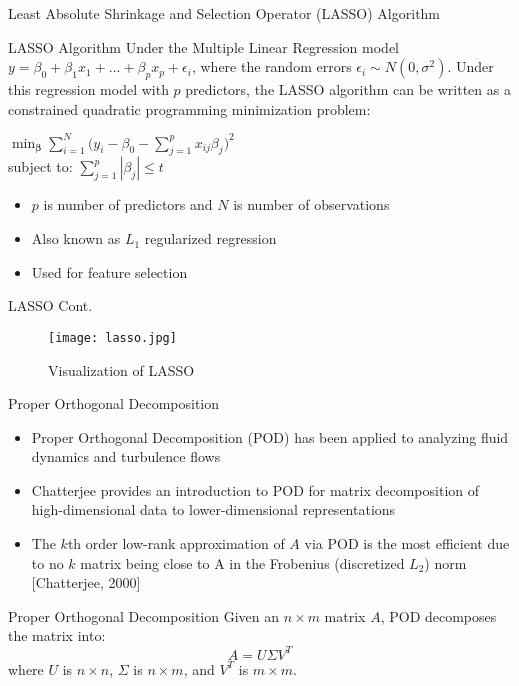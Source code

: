 \documentclass[aspectratio=169,xcolor=dvipsnames]{beamer}
\begin{document}
\begin{frame}{Least Absolute Shrinkage and Selection Operator (LASSO) Algorithm}
\begin{block}{LASSO Algorithm}
Under the Multiple Linear Regression model $y=\beta_0+\beta_1x_1+...+\beta_px_{p}+\epsilon_{i}$, where the random errors $\epsilon_{i} \sim N(0, \sigma^2)$. Under this regression model with $p$ predictors, the LASSO algorithm can be written as a constrained quadratic programming minimization problem:
\begin{center}
    $\displaystyle {\min_{\boldsymbol{\beta}} \sum_{i=1}^{N} {(y_{i}-\beta_{0}-\sum_{j=1}^{p} {x_{ij}\beta_{j}}})^2}$\\
    subject to:
    $\displaystyle\sum_{j=1}^{p} {|\beta_{j}|} \leq t$
\end{center}
\end{block}
\begin{itemize}
    \item $p$ is number of predictors and $N$ is number of observations
    \item Also known as $L_{1}$ regularized regression
    \item Used for feature selection
\end{itemize}
\end{frame}

\begin{frame}{LASSO Cont.}
\begin{figure}
    \centering
    \texttt{[image: lasso.jpg]}
    \label{fig:LASSO}
    \caption{Visualization of LASSO}
\end{figure}
\end{frame}

\begin{frame}{Proper Orthogonal Decomposition}
    \begin{itemize}
        \item Proper Orthogonal Decomposition (POD) has been applied to analyzing fluid dynamics and turbulence flows
        \item Chatterjee provides an introduction to POD for matrix decomposition of high-dimensional data to lower-dimensional representations
        \item The $k$th order low-rank approximation of $A$ via POD is the most efficient due to no $k$ matrix being close to A in the Frobenius (discretized $L_{2}$) norm [Chatterjee, 2000]
    \end{itemize}
    \begin{block}{Proper Orthogonal Decomposition}
    Given an $n \times m$ matrix $A$, POD decomposes the matrix into:
    \begin{equation}
        A = U \Sigma V^T
        \label{eqn:pod_eqn}
    \end{equation}
    where $U$ is $n \times n$, $\Sigma$ is $n \times m$, and $V^T$ is $m \times m$.
    \end{block}
\end{frame}
\end{document}
